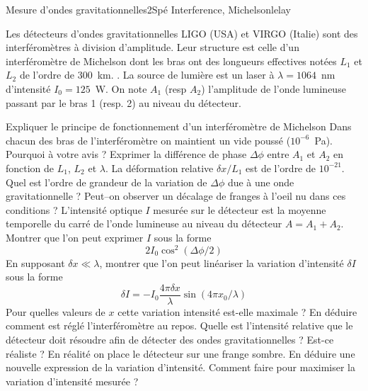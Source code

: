 \begin{exercise}{Mesure d'ondes gravitationnelles}{2}{Spé}
{Interference, Michelson}{lelay}

Les détecteurs d’ondes gravitationnelles LIGO (USA) et VIRGO (Italie) sont des interféromètres à division d'amplitude. Leur structure est celle d’un interféromètre de Michelson dont les bras ont des longueurs effectives notées $L_1$ et $L_2$ de l'ordre de 300~km. . La source de lumière est un laser à $\lambda=1064$~nm d'intensité $I_0 = 125$~W. On note $A_1$ (resp $A_2$) l'amplitude de l'onde lumineuse passant par le bras 1 (resp. 2) au niveau du détecteur.
\begin{questions}
    \questioncours Expliquer le principe de fonctionnement d'un interféromètre de Michelson
    \question Dans chacun des bras de l'interféromètre on maintient un vide poussé ($10^{-6}$~Pa). Pourquoi à votre avis ?
    \question Exprimer la différence de phase $\Delta \phi$ entre $A_1$ et $A_2$ en fonction de $L_1$, $L_2$ et $\lambda$.
    \question La déformation relative $\delta x / L_1$ est de l'ordre de $10^{-21}$. Quel est l’ordre de grandeur de la variation de $\Delta \phi$ due à une onde gravitationnelle ? Peut–on observer un décalage de franges à l'oeil nu dans ces conditions ?
    \question L'intensité optique $I$ mesurée sur le détecteur est la moyenne temporelle du carré de l'onde lumineuse au niveau du détecteur $A=A_1+A_2$. Montrer que l'on peut exprimer $I$ sous la forme
    $$2 I_0\cos^2(\Delta\phi/2)$$
    \question En supposant $\delta x \ll \lambda$, montrer que l'on peut linéariser la variation d'intensité $\delta I$ sous la forme
    $$
    \delta I = -I_0\frac{4\pi \delta x}{\lambda}\sin(4\pi x_0 /\lambda)
    $$
    \question Pour quelles valeurs de $x$ cette variation intensité est-elle maximale ? En déduire comment est réglé l'interféromètre au repos.
    \question Quelle est l'intensité relative que le détecteur doit résoudre afin de détecter des ondes gravitationnelles ? Est-ce réaliste ?
    \question En réalité on place le détecteur sur une frange sombre. En déduire une nouvelle expression de la variation d'intensité.
    \question Comment faire pour maximiser la variation d'intensité mesurée ?
    
\end{questions}

\end{exercise}


